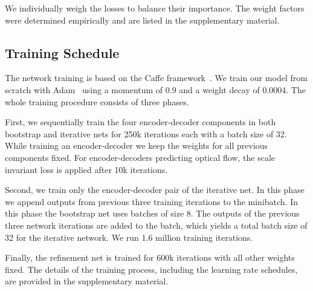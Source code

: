 \documentclass[10pt,twocolumn,letterpaper]{article}
\begin{document}
 We individually weigh the losses to 
balance their importance.
The weight factors were determined empirically and are listed in the supplementary material.


\subsection{Training Schedule}
The network training is based on the Caffe framework~\cite{jia_caffe:_2014}. We train our model from scratch with Adam~\cite{kingma_adam:_2014} using a momentum of 0.9 and a weight decay of 0.0004. 
The whole training procedure consists of three phases.%

First, we sequentially train the four encoder-decoder components in both bootstrap and iterative nets for 250k iterations each with a batch size of 32.
While training an encoder-decoder we keep the weights for all previous components fixed.
For encoder-decoders predicting optical flow, the scale invariant loss is applied after 10k iterations.


Second, we train only the encoder-decoder pair of the iterative net.
In this phase we append outputs from previous three training iterations to the minibatch.
In this phase the bootstrap net uses batches of size 8. 
The outputs of the previous three network iterations are added to the batch, which yields a total batch size of 32 for the iterative network. 
We run 1.6 million training iterations.

Finally, the refinement net is trained for 600k iterations with all other weights fixed. 
The details of the training process, including the learning rate schedules, are provided in the supplementary material.
\end{document}
